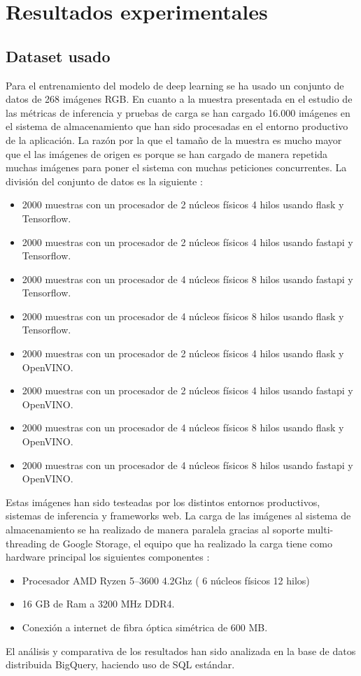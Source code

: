 \mbox{}


\chapter{Resultados experimentales}
\label{ch:chapte5}


\section{Dataset usado}\label{sec:dataset-usado}
Para el entrenamiento del modelo de deep learning se ha usado un conjunto de datos de 268 imágenes RGB\@.
En cuanto a la muestra presentada en el estudio de las métricas de inferencia y pruebas de carga se han cargado 16.000 imágenes en el sistema de almacenamiento que han sido procesadas en el entorno productivo de la aplicación.
La razón por la que el tamaño de la muestra es mucho mayor que el las imágenes de origen es porque se han cargado de manera repetida muchas imágenes para poner el sistema con muchas peticiones concurrentes.
La división del conjunto de datos es la siguiente :
\begin{itemize}
    \item 2000 muestras con un procesador de 2 núcleos físicos 4 hilos usando flask y Tensorflow.
    \item 2000 muestras con un procesador de 2 núcleos físicos 4 hilos usando fastapi y Tensorflow.
    \item 2000 muestras con un procesador de 4 núcleos físicos 8 hilos usando fastapi y Tensorflow.
    \item 2000 muestras con un procesador de 4 núcleos físicos 8 hilos usando flask y Tensorflow.
    \item 2000 muestras con un procesador de 2 núcleos físicos 4 hilos usando flask y OpenVINO\@.
    \item 2000 muestras con un procesador de 2 núcleos físicos 4 hilos usando fastapi y OpenVINO\@.
    \item 2000 muestras con un procesador de 4 núcleos físicos 8 hilos usando flask y OpenVINO\@.
    \item 2000 muestras con un procesador de 4 núcleos físicos 8 hilos usando fastapi y OpenVINO\@.
\end{itemize}
Estas imágenes han sido testeadas por los distintos entornos productivos, sistemas de inferencia y frameworks web.
La carga de las imágenes al sistema de almacenamiento se ha realizado de manera paralela gracias al soporte multi-threading de Google Storage, el equipo que ha realizado la carga tiene como hardware principal los siguientes componentes :
\begin{itemize}
    \item Procesador AMD Ryzen 5--3600 4.2Ghz ( 6 núcleos físicos 12 hilos)
    \item 16 GB de Ram a 3200 MHz DDR4.
    \item Conexión a internet de fibra óptica simétrica de 600 MB\@.
\end{itemize}
El análisis y comparativa de los resultados han sido analizada en la base de datos distribuida BigQuery, haciendo uso de SQL estándar.


